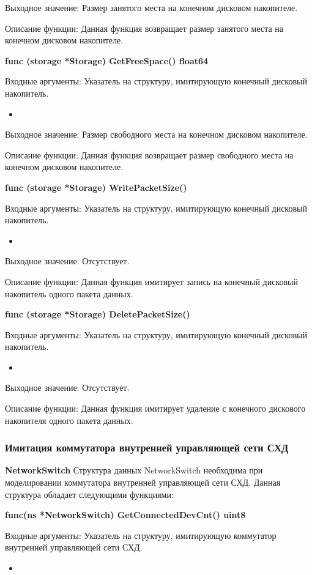 Выходное значение:  Размер занятого места на конечном дисковом накопителе.

Описание функции: Данная функция возвращает размер занятого места на конечном дисковом накопителе.

\textbf{func (storage *Storage) GetFreeSpace() float64}

Входные аргументы: Указатель на структуру, имитирующую конечный дисковый накопитель.
\begin{itemize}
	\item 
\end{itemize}

Выходное значение: Размер свободного места на конечном дисковом накопителе.

Описание функции: Данная функция возвращает размер свободного места на конечном дисковом накопителе.

\textbf{func (storage *Storage) WritePacketSize() }

Входные аргументы: Указатель на структуру, имитирующую конечный дисковый накопитель.
\begin{itemize}
	\item 
\end{itemize}
Выходное значение: Отсутствует.

Описание функции: Данная функция имитирует запись на конечный дисковый накопитель одного пакета данных.

\textbf{func (storage *Storage) DeletePacketSize()}

Входные аргументы: Указатель на структуру, имитирующую конечный дисковый накопитель.
\begin{itemize}
	\item 
\end{itemize}

Выходное значение: Отсутствует.

Описание функции: Данная функция имитирует удаление с конечного дискового накопителя одного пакета данных.

\subsubsection{Имитация коммутатора внутренней управляющей сети СХД}
\textbf{NetworkSwitch}
Структура данных NetworkSwitch необходима при моделировании коммутатора внутренней управляющей сети СХД. Данная структура обладает следующими функциями:

\textbf{func(ns *NetworkSwitch) GetConnectedDevCnt() uint8}

Входные аргументы: Указатель на структуру, имитирующую коммутатор внутренней управляющей сети СХД.
\begin{itemize}
	\item 
\end{itemize}


